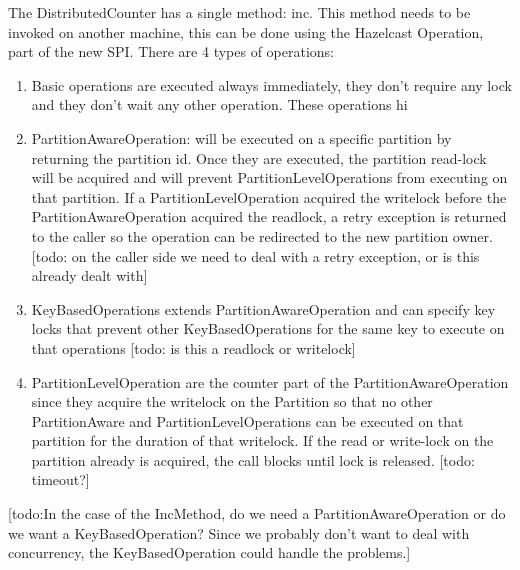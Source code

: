 The DistributedCounter has a single method: inc. This method needs to be invoked on another machine, this can be done using the Hazelcast Operation, part of the new SPI. There are 4 types of operations:
\begin{enumerate}
\item Basic operations are executed always immediately, they don't require any lock and they don't wait any other operation. These operations hi
\item PartitionAwareOperation: will be executed on a specific partition by returning the partition id. Once they are executed, the partition read-lock will be acquired and will prevent PartitionLevelOperations from executing on that partition. If a PartitionLevelOperation acquired the writelock before the PartitionAwareOperation acquired the readlock, a retry exception is returned to the caller so the operation can be redirected to the new partition owner. [todo: on the caller side we need to deal with a retry exception, or is this already dealt with]
\item KeyBasedOperations extends PartitionAwareOperation and can specify key locks that prevent other KeyBasedOperations for the same key to execute on that operations [todo: is this a readlock or writelock]
\item PartitionLevelOperation are the counter part of the PartitionAwareOperation since they acquire the writelock on the Partition so that no other PartitionAware and PartitionLevelOperations can be executed on that partition for the duration of that writelock. If the read or write-lock on the partition already is acquired, the call blocks until lock is released. [todo: timeout?]
\end{enumerate}
[todo:In the case of the IncMethod, do we need a PartitionAwareOperation or do we want a KeyBasedOperation? Since we probably don't want to deal with concurrency, the KeyBasedOperation could handle the problems.]

